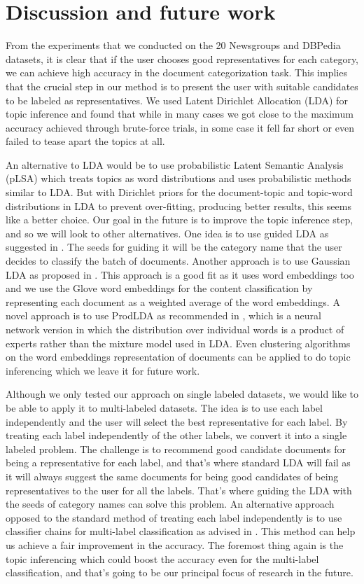 \section{Discussion and future work}
From the experiments that we conducted on the 20 Newsgroups and DBPedia datasets, it is clear that if the user chooses good representatives for each category, we can achieve high accuracy in the document categorization task. This implies that the crucial step in our method is to present the user with suitable candidates to be labeled as representatives.  We used Latent Dirichlet Allocation (LDA) for topic inference and found that while in many cases we got close to the maximum accuracy achieved through brute-force trials, in some case it fell far short or even failed to tease apart the topics at all.

An alternative to LDA would be to use probabilistic Latent Semantic Analysis (pLSA) which treats topics as word distributions and uses probabilistic methods similar to LDA. But with Dirichlet priors for the document-topic and topic-word distributions in LDA to prevent over-fitting, producing better results, this seems like a better choice. Our goal in the future is to improve the topic inference step, and so we will look to other alternatives. One idea is to use guided LDA as suggested in \citep{conf/eacl/JagarlamudiDU12}.  The seeds for guiding it will be the category name that the user decides to classify the batch of documents.  Another approach is to use Gaussian LDA as proposed in \citep{conf/acl/DasZD15}.  This approach is a good fit as it uses word embeddings too and we use the Glove word embeddings for the content classification by representing each document as a weighted average of the word embeddings.  A novel approach is to use ProdLDA as recommended in \citep{2017arXiv170301488S}, which is a neural network version in which the distribution over individual words is a product of experts rather than the mixture model used in LDA.  Even clustering algorithms on the word embeddings representation of documents can be applied to do topic inferencing which we leave it for future work.

Although we only tested our approach on single labeled datasets, we would like to be able to apply it to multi-labeled datasets. The idea is to use each label independently and the user will select the best representative for each label. By treating each label independently of the other labels, we convert it into a single labeled problem. The challenge is to recommend good candidate documents for being a representative for each label, and that's where standard LDA will fail as it will always suggest the same documents for being good candidates of being representatives to the user for all the labels.  That's where guiding the LDA with the seeds of category names can solve this problem.  An alternative approach opposed to the standard method of treating each label independently is to use classifier chains for multi-label classification as advised in \citep{Read2009}.  This method can help us achieve a fair improvement in the accuracy.  The foremost thing again is the topic inferencing which could boost the accuracy even for the multi-label classification, and that's going to be our principal focus of research in the future.
